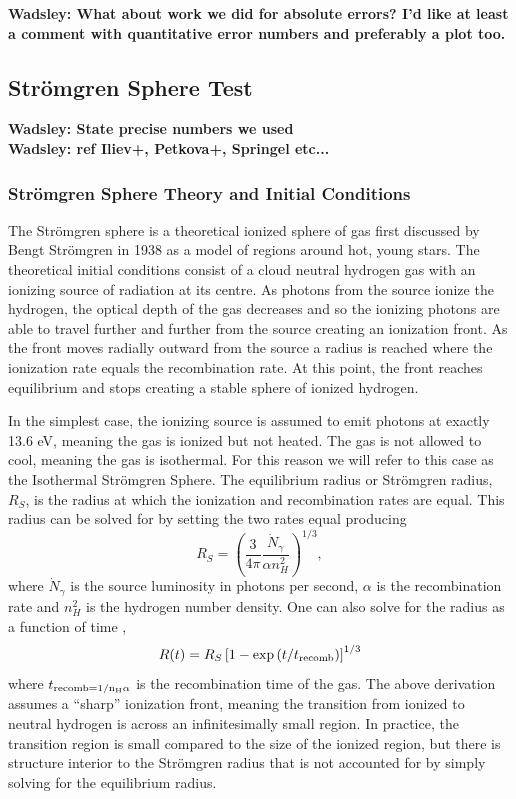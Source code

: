 \documentclass[fleq,usenatbib]{mnras}
\newcommand{\comment}[1]{\textbf{\color{red}#1}}
\newcommand{\strom}{Str\"omgren}
\begin{document}
\comment{Wadsley: What about work we did for absolute errors? I'd like at 
least a comment with quantitative error numbers and preferably a plot too.}

\subsection{\strom{} Sphere Test}
\comment{Wadsley: State precise numbers we used} \\
\comment{Wadsley: ref Iliev+,  Petkova+, Springel etc...}
\subsubsection{\strom{} Sphere Theory and Initial Conditions}
The \strom{} sphere is a theoretical ionized sphere of gas first discussed by 
Bengt \strom{} in 1938 \citep{stromgren39} as a model of regions around hot, 
young stars. The theoretical initial conditions 
consist of a cloud neutral hydrogen gas with an ionizing source of radiation 
at its centre. As photons from the source ionize the hydrogen, the optical 
depth of the gas decreases and so the ionizing photons are able to travel 
further and further from the source creating an ionization front. As the front 
moves radially outward from the source a radius is reached where the 
ionization rate equals the recombination rate. At this point, the front 
reaches equilibrium and stops creating a stable sphere of ionized hydrogen.

In the simplest case, the ionizing source is assumed to emit photons at 
exactly 13.6 eV, meaning the gas is ionized but not heated. The gas is not 
allowed to cool, meaning the gas is isothermal. For this reason we will refer 
to this case as the Isothermal \strom{} Sphere. The equilibrium radius or 
\strom{} radius, $R_S$, is the radius at which the ionization and 
recombination rates are equal. This radius can be solved for by setting the 
two rates equal producing \citep[e.g.][]{tielens05}
\begin{equation}
R_S = \left(\frac{3}{4\pi}\frac{\dot{N}_\gamma}{\alpha n^2_{H}}\right)^{1/3},
\end{equation}
where $\dot{N}_\gamma$ is the source luminosity in photons per second, 
$\alpha$ is the recombination rate and $n^2_H$ is the hydrogen number density. 
One can also solve for the radius as a function of time 
\citep[e.g.][]{spitzer78},
\begin{equation}
R(t) = R_S\left[1-\exp\left(t/t_{\rm recomb}\right)\right]^{1/3}
\end{equation}
where $t_{\rm recomb = 1/{n_H \alpha}}$ is the recombination time of the 
gas. The above derivation assumes a ``sharp'' ionization front, meaning the 
transition from ionized to neutral hydrogen is across an infinitesimally small 
region. In practice, the transition region is small compared to the size of 
the ionized region, but there is structure interior to the \strom{} radius 
that is not accounted for by simply solving for the equilibrium radius. 
\end{document}
